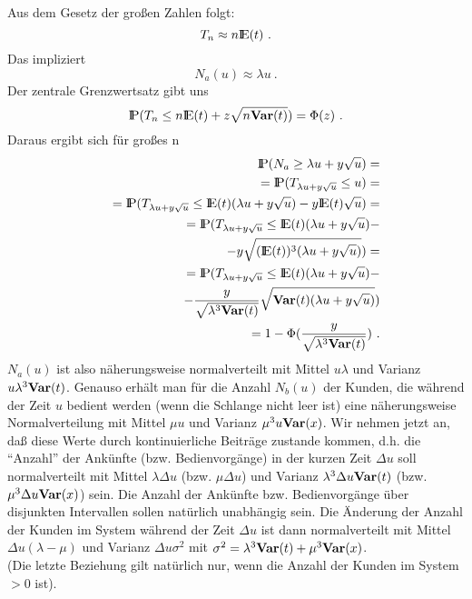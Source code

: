 \begin{enumerate}
Aus dem Gesetz der großen Zahlen folgt:
\[ T_{n} \approx n{\rm I\kern-0.2em E}(t) ~.\]
Das impliziert
\[N_{a}(u) \approx \lambda u ~. \]
Der zentrale Grenzwertsatz gibt uns
\[{\rm I\kern-0.2em P}(T_{n} \leq n{\rm I\kern-0.2em E}(t)+z\sqrt{n{\bf Var}(t)}) = \Phi (z) ~.   \]
Daraus ergibt sich für großes n
\begin{eqnarray*}
& &{\rm I\kern-0.2em P}(N_{a}\geq\lambda u + y\sqrt{u}) = \\
& & ~ ~={\rm I\kern-0.2em P}(T_{\lambda u + y\sqrt{u}} \leq u) = \\
& & ~ ~={\rm I\kern-0.2em P}(T_{\lambda u + y\sqrt{u}} \leq {\rm I\kern-0.2em E}(t)(\lambda u + y\sqrt{u}) - y{\rm I\kern-0.2em E}(t)\sqrt{u} ) = \\
& & ~ ~={\rm I\kern-0.2em P}(T_{\lambda u + y\sqrt{u}} \leq {\rm I\kern-0.2em E}(t)(\lambda u + y\sqrt{u}) - \\
& & ~ ~ ~ ~ ~- y\sqrt{({\rm I\kern-0.2em E}(t))^{3}(\lambda u + y\sqrt{u})})=\\
& &~ ~={\rm I\kern-0.2em P}(T_{\lambda u + y\sqrt{u}} \leq {\rm I\kern-0.2em E}(t)(\lambda u + y\sqrt{u}) - \\
& & ~ ~ ~ ~ ~-\frac{y}{\sqrt{\lambda ^{3}{\bf Var}(t)}}\sqrt{{\bf Var}(t)(\lambda u + y\sqrt{u})}) \\
& &~ ~=1 - \Phi(\frac{y}{\sqrt{\lambda ^{3}{\bf Var}(t)}}) ~.
\end{eqnarray*}
$N_{a}(u)$ ist also näherungsweise normalverteilt mit Mittel $u\lambda$ und Varianz $u\lambda^{3}{\bf Var}(t)$. Genauso erhält man für die Anzahl $N_{b}(u)$
der
Kunden, die während der Zeit $u$ bedient werden (wenn die Schlange nicht leer ist) eine näherungsweise Normalverteilung mit Mittel $\mu u$ und Varianz
$\mu^{3}u{\bf Var}(x)$. Wir nehmen jetzt an, daß diese Werte durch kontinuierliche Beiträge zustande kommen, d.h. die \enquote{Anzahl} der Ankünfte (bzw.
Bedienvorgänge)
in der kurzen Zeit $\Delta u$ soll normalverteilt mit Mittel $\lambda\Delta u$ (bzw. $\mu\Delta u$) und Varianz $\lambda^{3}\Delta u{\bf Var}(t)$ (bzw.
$\mu^{3}\Delta
u{\bf Var}(x)$) sein. Die Anzahl der Ankünfte bzw. Bedienvorgänge über disjunkten Intervallen sollen natürlich unabhängig sein. Die Änderung der Anzahl der
Kunden
im System während der Zeit $\Delta u$ ist dann normalverteilt mit Mittel $\Delta u(\lambda - \mu)$ und Varianz $\Delta u\sigma^{2}$ mit $\sigma^{2} =
\lambda^{3}{\bf Var}(t) + \mu^{3}{\bf Var}(x)$.\\
(Die letzte Beziehung gilt natürlich nur, wenn die Anzahl der Kunden im System $> 0$ ist).


\end{enumerate}

